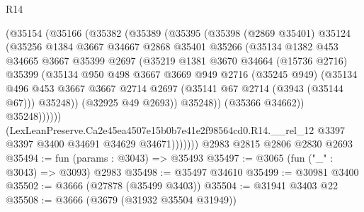 \begin{lexlean}{R14}
\begin{coremodule}
                  (@35154
                    (@35166
                      (@35382
                        (@35389
                          (@35395
                            (@35398
                              (@2869 @35401)
                              @35124
                              (@35256
                                @1384
                                @3667
                                @34667
                                @2868
                                @35401
                                @35266
                                (@35134
                                  @1382
                                  @453
                                  @34665
                                  @3667
                                  @35399
                                  @2697
                                  (@35219
                                    @1381
                                    @3670
                                    @34664
                                    (@15736 @2716)
                                    @35399
                                    (@35134
                                      @950
                                      @498
                                      @3667
                                      @3669
                                      @949
                                      @2716
                                      (@35245 @949)
                                      (@35134
                                        @496
                                        @453
                                        @3667
                                        @3667
                                        @2714
                                        @2697
                                        (@35141 @67 @2714 (@3943 (@35144 @67)))
                                        @35248))
                                    (@32925 @49 @2693))
                                  @35248))
                              (@35366 @34662))
                            @35248))))))
                (LexLeanPreserve.Ca2e45ea4507e15b0b7e41e2f98564cd0.R14.__rel_12
                  @3397
                  @3397
                  @3400
                  @34691
                  @34629
                  @34671)))))))
    @2983
    @2815
    @2806
    @2830
    @2693
@35494 := fun (params : @3043) => @35493
@35497 := @3065 (fun ("_" : @3043) => @3093) @2983
@35498 := @35497 @34610
@35499 := @30981 @3400
@35502 := @3666 (@27878 (@35499 @3403))
@35504 := @31941 @3403 @22
@35508 := @3666 (@3679 (@31932 @35504 @31949))

\end{coremodule}
\end{lexlean}
